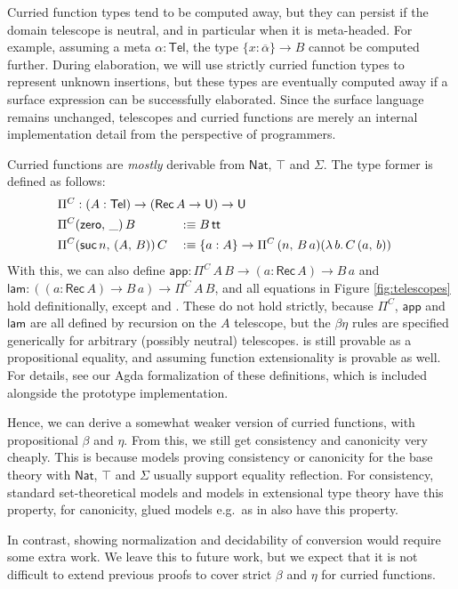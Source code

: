 \documentclass[acmsmall,review,anonymous,prologue,dvipsnames]{acmart}\settopmatter{printfolios=true,printccs=false,printacmref=false}
\renewcommand{\U}{\mathsf{U}}
\renewcommand{\tt}{\mathsf{tt}}
\newcommand{\Nat}{\mathsf{Nat}}
\newcommand{\zero}{\mathsf{zero}}
\newcommand{\suc}{\mathsf{suc}}
\newcommand{\Tel}{\mathsf{Tel}}
\newcommand{\Rec}{\mathsf{Rec}}
\newcommand{\ol}[1]{\overline{#1}}
\theoremstyle{remark}
\begin{document}
Curried function types tend to be computed away, but they can persist if the
domain telescope is neutral, and in particular when it is meta-headed. For
example, assuming a meta $\alpha : \Tel$, the type $\{x : \ol{\alpha}\}\to B$
cannot be computed further. During elaboration, we will use strictly curried
function types to represent unknown insertions, but these types are eventually
computed away if a surface expression can be successfully elaborated. Since the
surface language remains unchanged, telescopes and curried functions are merely
an internal implementation detail from the perspective of programmers.

Curried functions are \emph{mostly} derivable from $\Nat$, $\top$ and $\Sigma$.
The type former is defined as follows:
\begin{alignat*}{3}
& \rlap{$\Pi^C : (A : \Tel) \to (\Rec\,A \to \U) \to \U$}\\
& \Pi^C (\zero,\,\_)\,B && :\equiv B\,\tt\\
& \Pi^C (\suc\,n,\,(A,\,B))\,C && :\equiv \{a : A\}\to \Pi^C\,(n,\,B\,a) (\lambda\,b.\,C\,(a,\,b))
\end{alignat*}
With this, we can also define $\mathsf{app} : \Pi^C\,A\,B \to (a : \Rec\,A) \to
B\, a$ and $\mathsf{lam} : ((a : \Rec\,A) \to B\, a) \to \Pi^C\,A\,B$, and all
equations in Figure \ref{fig:telescopes} hold definitionally, except
 and . These do not hold
strictly, because $\Pi^C$, $\mathsf{app}$ and $\mathsf{lam}$ are all defined by
recursion on the $A$ telescope, but the $\beta\eta$ rules are specified
generically for arbitrary (possibly neutral)
telescopes.  is still provable as a propositional
equality, and assuming function extensionality  is
provable as well. For details, see our Agda formalization of these definitions,
which is included alongside the prototype implementation.

Hence, we can derive a somewhat weaker version of curried functions, with
propositional $\beta$ and $\eta$. From this, we still get consistency and
canonicity very cheaply. This is because models proving consistency or
canonicity for the base theory with $\Nat$, $\top$ and $\Sigma$ usually support
equality reflection. For consistency, standard set-theoretical models and models
in extensional type theory have this property, for canonicity, glued models
e.g.\ as in \cite{kaposi2019gluing, sterling2019algebraic} also have this property.

In contrast, showing normalization and decidability of conversion would require
some extra work. We leave this to future work, but we expect that it is not
difficult to extend previous proofs to cover strict $\beta$ and $\eta$ for
curried functions.
\end{document}
